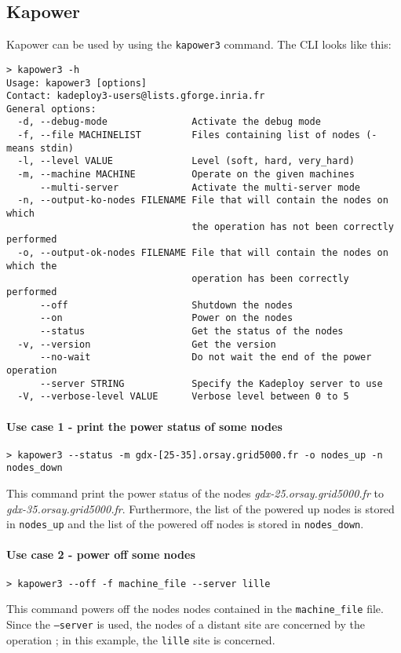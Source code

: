 \documentclass[a4wide,10pt,oneside]{book}
\begin{document}
\subsection{Kapower}\label{sec:kapower}
Kapower can be used by using the \texttt{kapower3} command. The CLI looks like this:
\begin{small}
\begin{verbatim}
> kapower3 -h
Usage: kapower3 [options]
Contact: kadeploy3-users@lists.gforge.inria.fr
General options:
  -d, --debug-mode               Activate the debug mode
  -f, --file MACHINELIST         Files containing list of nodes (- means stdin)
  -l, --level VALUE              Level (soft, hard, very_hard)
  -m, --machine MACHINE          Operate on the given machines
      --multi-server             Activate the multi-server mode
  -n, --output-ko-nodes FILENAME File that will contain the nodes on which 
                                 the operation has not been correctly performed
  -o, --output-ok-nodes FILENAME File that will contain the nodes on which the
                                 operation has been correctly performed
      --off                      Shutdown the nodes
      --on                       Power on the nodes
      --status                   Get the status of the nodes
  -v, --version                  Get the version
      --no-wait                  Do not wait the end of the power operation
      --server STRING            Specify the Kadeploy server to use
  -V, --verbose-level VALUE      Verbose level between 0 to 5
\end{verbatim}
\end{small}

\paragraph{Use case 1 - print the power status of some nodes}
\begin{verbatim}
> kapower3 --status -m gdx-[25-35].orsay.grid5000.fr -o nodes_up -n nodes_down
\end{verbatim}
This command print the power status of the nodes \textit{gdx-25.orsay.grid5000.fr} to \textit{gdx-35.orsay.grid5000.fr}. Furthermore, the list of the powered up nodes is stored in \texttt{nodes\_up} and the list of the powered off nodes is stored in \texttt{nodes\_down}.

\paragraph{Use case 2 - power off some nodes}
\begin{verbatim}
> kapower3 --off -f machine_file --server lille
\end{verbatim}
This command powers off the nodes nodes contained in the \texttt{machine\_file} file. Since the \texttt{--server} is used, the nodes of a distant site are concerned by the operation ; in this example, the \texttt{lille} site is concerned.
\end{document}
